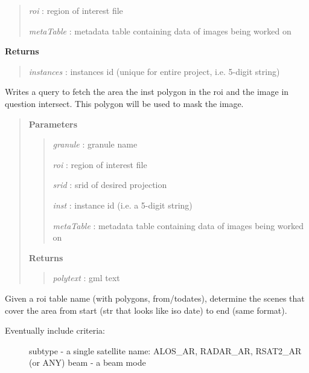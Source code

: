 \documentclass[letterpaper,10pt,openany,oneside]{sphinxmanual}
\begin{document}
\begin{fulllineitems}
\begin{fulllineitems}
\begin{quote}
\emph{roi}        : region of interest file

\emph{metaTable}  : metadata table containing data of images being worked on
\end{quote}

\textbf{Returns}
\begin{quote}

\emph{instances}  : instances id (unique for entire project, i.e. 5-digit string)
\end{quote}

\end{fulllineitems}


\begin{fulllineitems}
\label{code:Database.Database.qryMaskZone}
Writes a query to fetch the area the inst polygon in the roi and the image in question intersect. 
This polygon will be used to mask the image.
\begin{quote}

\textbf{Parameters}
\begin{quote}

\emph{granule}    : granule name

\emph{roi}        : region of interest file

\emph{srid}       : srid of desired projection

\emph{inst}       : instance id (i.e. a 5-digit string)

\emph{metaTable}  : metadata table containing data of images being worked on
\end{quote}

\textbf{Returns}
\begin{quote}

\emph{polytext}  :   gml text
\end{quote}
\end{quote}

\end{fulllineitems}


\begin{fulllineitems}
\label{code:Database.Database.qrySelectFromAvailable}
Given a roi table name (with polygons, from/todates), determine the scenes that cover the area
from start (str that looks like iso date) to end (same format).
\begin{description}
\item[{Eventually include criteria:}] \leavevmode
subtype - a single satellite name: ALOS\_AR, RADAR\_AR, RSAT2\_AR (or ANY)        
beam - a beam mode


\end{description}
\end{fulllineitems}
\end{fulllineitems}
\end{document}
